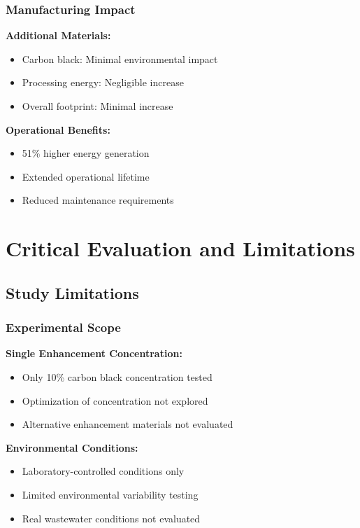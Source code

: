 \documentclass[12pt,a4paper]{article}
\begin{document}
\subsubsection{Manufacturing Impact}

\textbf{Additional Materials:}
\begin{itemize}
    \item Carbon black: Minimal environmental impact
    \item Processing energy: Negligible increase
    \item Overall footprint: Minimal increase
\end{itemize}

\textbf{Operational Benefits:}
\begin{itemize}
    \item 51\% higher energy generation
    \item Extended operational lifetime
    \item Reduced maintenance requirements
\end{itemize}

\section{Critical Evaluation and Limitations}

\subsection{Study Limitations}

\subsubsection{Experimental Scope}

\textbf{Single Enhancement Concentration:}
\begin{itemize}
    \item Only 10\% carbon black concentration tested
    \item Optimization of concentration not explored
    \item Alternative enhancement materials not evaluated
\end{itemize}

\textbf{Environmental Conditions:}
\begin{itemize}
    \item Laboratory-controlled conditions only
    \item Limited environmental variability testing
    \item Real wastewater conditions not evaluated
\end{itemize}
\end{document}
